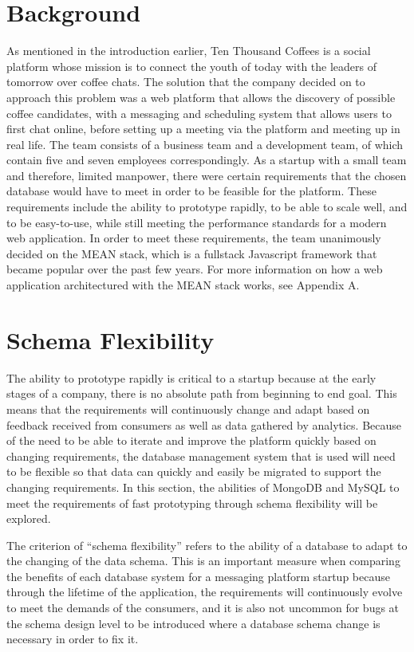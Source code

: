 \documentclass[12pt]{article}
\begin{document}
\section{Background}
As mentioned in the introduction earlier, Ten Thousand Coffees is a social platform whose mission is to connect the youth of today with the leaders of tomorrow over coffee chats. The solution that the company decided on to approach this problem was a web platform that allows the discovery of possible coffee candidates, with a messaging and scheduling system that allows users to first chat online, before setting up a meeting via the platform and meeting up in real life. The team consists of a business team and a development team, of which contain five and seven employees correspondingly. As a startup with a small team and therefore, limited manpower, there were certain requirements that the chosen database would have to meet in order to be feasible for the platform. These requirements include the ability to prototype rapidly, to be able to scale well, and to be easy-to-use, while still meeting the performance standards for a modern web application. In order to meet these requirements, the team unanimously decided on the MEAN stack, which is a fullstack Javascript framework that became popular over the past few years. For more information on how a web application architectured with the MEAN stack works, see Appendix A.


\section{Schema Flexibility}

The ability to prototype rapidly is critical to a startup because at the early stages of a company, there is no absolute path from beginning to end goal. This means that the requirements will continuously change and adapt based on feedback received from consumers as well as data gathered by analytics. Because of the need to be able to iterate and improve the platform quickly based on changing requirements, the database management system that is used will need to be flexible so that data can quickly and easily be migrated to support the changing requirements. In this section, the abilities of MongoDB and MySQL to meet the requirements of fast prototyping through schema flexibility will be explored.

The criterion of ``schema flexibility'' refers to the ability of a database to adapt to the changing of the data schema. This is an important measure when comparing the benefits of each database system for a messaging platform startup because through the lifetime of the application, the requirements will continuously evolve to meet the demands of the consumers, and it is also not uncommon for bugs at the schema design level to be introduced where a database schema change is necessary in order to fix it.
\end{document}
